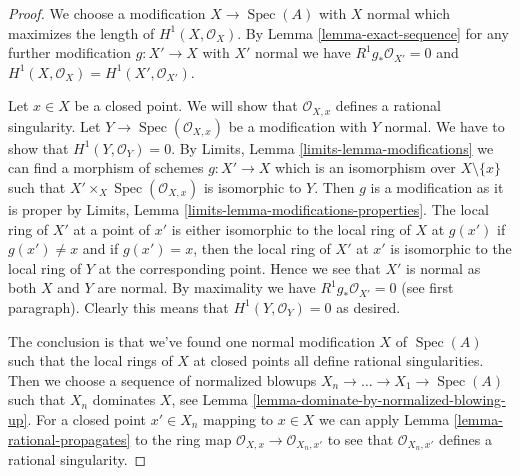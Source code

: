 \documentclass[10pt,a4paper]{amsart}
\theoremstyle{plain}
\theoremstyle{definition}
\theoremstyle{remark}
\numberwithin{equation}{subsection}
\def\Spec{\mathop{\mathrm{Spec}}}
\begin{document}
\begin{proof}
We choose a modification $X \to \Spec(A)$ with $X$ normal
which maximizes the length of $H^1(X, \mathcal{O}_X)$.
By Lemma \ref{lemma-exact-sequence}
for any further modification $g : X' \to X$ with $X'$ normal
we have $R^1g_*\mathcal{O}_{X'} = 0$ and
$H^1(X, \mathcal{O}_X) = H^1(X', \mathcal{O}_{X'})$.

\medskip\noindent
Let $x \in X$ be a closed point. We will show that $\mathcal{O}_{X, x}$
defines a rational singularity. Let $Y \to \Spec(\mathcal{O}_{X, x})$
be a modification with $Y$ normal. We have to show that
$H^1(Y, \mathcal{O}_Y) = 0$. By
Limits, Lemma \ref{limits-lemma-modifications}
we can find a morphism of schemes $g : X' \to X$ which is an isomorphism
over $X \setminus \{x\}$ such that $X' \times_X \Spec(\mathcal{O}_{X, x})$
is isomorphic to $Y$. Then $g$ is a modification as it is proper by
Limits, Lemma \ref{limits-lemma-modifications-properties}.
The local ring of $X'$ at a point of $x'$ is either isomorphic
to the local ring of $X$ at $g(x')$ if $g(x') \not = x$ and
if $g(x') = x$, then the local ring of $X'$ at $x'$ is isomorphic
to the local ring of $Y$ at the corresponding point. Hence we see
that $X'$ is normal as both $X$ and $Y$ are normal. By maximality
we have $R^1g_*\mathcal{O}_{X'} = 0$ (see first paragraph). Clearly
this means that $H^1(Y, \mathcal{O}_Y) = 0$ as desired.

\medskip\noindent
The conclusion is that we've found one normal modification $X$
of $\Spec(A)$ such that the local rings of $X$ at closed points all define
rational singularities. Then we choose a sequence of normalized
blowups $X_n \to \ldots \to X_1 \to \Spec(A)$ such that $X_n$
dominates $X$, see Lemma \ref{lemma-dominate-by-normalized-blowing-up}.
For a closed point $x' \in X_n$ mapping to $x \in X$ we can apply
Lemma \ref{lemma-rational-propagates} to the ring map
$\mathcal{O}_{X, x} \to \mathcal{O}_{X_n, x'}$
to see that $\mathcal{O}_{X_n, x'}$ defines a rational singularity.
\end{proof}
\end{document}
